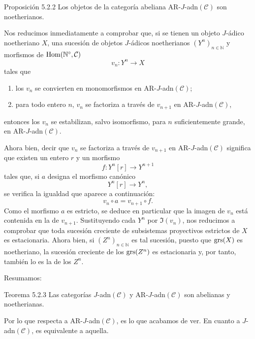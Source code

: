 \begin{statement}{Proposición 5.2.2}
Los objetos de la categoría abeliana AR-\(J\)-adn\((\mathcal C)\) son noetherianos.
\end{statement}

\begin{prooftext}
Nos reducimos inmediatamente a comprobar que, si se tienen un objeto \(J\)-ádico noetheriano \(X\), una sucesión de objetos \(J\)-ádicos noetherianos \((Y^n)_{n\in\mathbb N}\) y morfismos de \(\operatorname{Hom}(\mathbb N^\circ,\mathcal C)\)
\[
v_n:Y^n\longrightarrow X
\]
tales que
\begin{enumerate}[label=\textup{(\roman*)}]
\item los \(v_n\) se convierten en monomorfismos en AR-\(J\)-adn\((\mathcal C)\);
\item para todo entero \(n\), \(v_n\) se factoriza a través de \(v_{n+1}\) en AR-\(J\)-adn\((\mathcal C)\),
\end{enumerate}
entonces los \(v_n\) se estabilizan, salvo isomorfismo, para \(n\) suficientemente grande, en AR-\(J\)-adn\((\mathcal C)\).

Ahora bien, decir que \(v_n\) se factoriza a través de \(v_{n+1}\) en AR-\(J\)-adn\((\mathcal C)\) significa que existen un entero \(r\) y un morfismo
\[
f:Y^n[r]\longrightarrow Y^{n+1}
\]
tales que, si \(a\) designa el morfismo canónico
\[
Y^n[r]\longrightarrow Y^n,
\]
se verifica la igualdad que aparece a continuación:
\[
v_n\circ a=v_{n+1}\circ f .
\]
Como el morfismo \(a\) es estricto, se deduce en particular que la imagen de \(v_n\) está contenida en la de \(v_{n+1}\). Sustituyendo cada \(Y^n\) por \(\Im(v_n)\), nos reducimos a comprobar que toda sucesión creciente de subsistemas proyectivos estrictos de \(X\) es estacionaria. Ahora bien, si \((Z^n)_{n\in\mathbb N}\) es tal sucesión, puesto que \(\operatorname{grs}(X)\) es noetheriano, la sucesión creciente de los \(\operatorname{grs}(Z^n)\) es estacionaria y, por tanto, también lo es la de los \(Z^n\).
\end{prooftext}

Resumamos:

\begin{statement}{Teorema 5.2.3}
Las categorías \(J\)-adn\((\mathcal C)\) y AR-\(J\)-adn\((\mathcal C)\) son abelianas y noetherianas.
\end{statement}

Por lo que respecta a AR-\(J\)-adn\((\mathcal C)\), es lo que acabamos de ver. En cuanto a \(J\)-adn\((\mathcal C)\), es equivalente a aquella.
